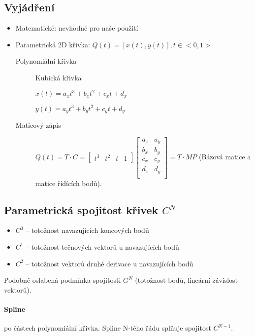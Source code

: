 \documentclass[a4paper, 11pt]{report}
\begin{document}
\subsection{Vyjádření}
\begin{itemize}
	\item Matematické: nevhodné pro naše použití
	\item Parametrická 2D křivka: $Q(t) = [x(t), y(t)], t \in <0,1>$
	
	\begin{description}
		\item[Polynomiální křivka] Kubická křivka
		
		$x(t) = a_x t^3 + b_x t^2 + c_x t + d_x$
		
		$y(t) = a_y t^3 + b_y t^2 + c_y t + d_y$
		
		\item[Maticový zápis] $Q(t) = T \cdot C =
\begin{bmatrix}
t^3 & t^2 & t & 1
\end{bmatrix}
\begin{bmatrix}
a_x & a_y\\
b_x & b_y\\
c_x & c_y\\
d_x & d_y\\
\end{bmatrix} = T \cdot M P$ (Bázová matice a matice řídících bodů).
	\end{description}
\end{itemize}

\subsection{Parametrická spojitost křivek $C^N$}
\begin{itemize}	
	\item $C^0$ -- totožnost navazujících koncových bodů
	\item $C^1$ -- totožnost tečnových vektorů u navazujících bodů
	\item $C^2$ -- totožnost vektorů druhé derivace u navazujících bodů
\end{itemize}

Podobně oslabená podmínka spojitosti $G^N$ (totožnost bodů, lineární závislost vektorů).

\paragraph{Spline} po částech polynomiální křivka. Spline N-tého řádu splňuje spojitost $C^{N-1}$.
\end{document}
